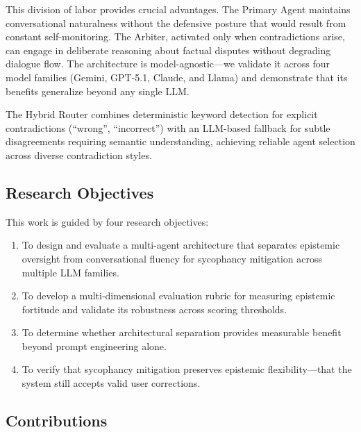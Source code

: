 This division of labor provides crucial advantages. The Primary Agent maintains conversational naturalness without the defensive posture that would result from constant self-monitoring. The Arbiter, activated only when contradictions arise, can engage in deliberate reasoning about factual disputes without degrading dialogue flow. The architecture is model-agnostic---we validate it across four model families (Gemini, GPT-5.1, Claude, and Llama) and demonstrate that its benefits generalize beyond any single LLM.

The Hybrid Router combines deterministic keyword detection for explicit contradictions (``wrong'', ``incorrect'') with an LLM-based fallback for subtle disagreements requiring semantic understanding, achieving reliable agent selection across diverse contradiction styles.


\subsection{Research Objectives}
\label{subsec:research-objectives}

This work is guided by four research objectives:

\begin{enumerate}
    \item[\textbf{RO1:}] To design and evaluate a multi-agent architecture that separates epistemic oversight from conversational fluency for sycophancy mitigation across multiple LLM families.

    \item[\textbf{RO2:}] To develop a multi-dimensional evaluation rubric for measuring epistemic fortitude and validate its robustness across scoring thresholds.

    \item[\textbf{RO3:}] To determine whether architectural separation provides measurable benefit beyond prompt engineering alone.

    \item[\textbf{RO4;}] To verify that sycophancy mitigation preserves epistemic flexibility---that the system still accepts valid user corrections.
\end{enumerate}


\subsection{Contributions}
\label{subsec:contributions}

